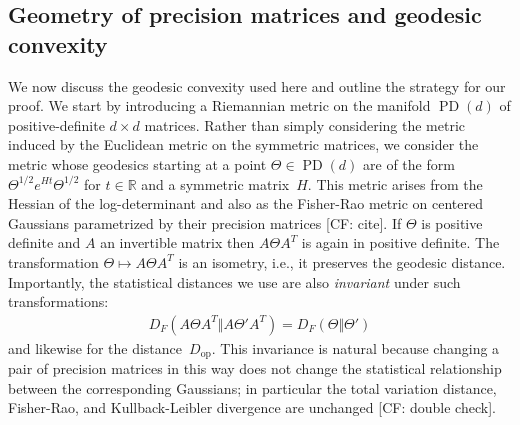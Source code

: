 \documentclass[aos]{imsart}
\theoremstyle{definition}
\numberwithin{equation}{section}
\DeclareMathOperator{\op}{op}
\DeclareMathOperator{\PD}{PD}
\DeclarePairedDelimiter{\norm}{\lVert}{\rVert}
\newcommand{\R}{{\mathbb{R}}}
\newcommand{\CF}[1]{{\color{purple}[CF: #1]}}
\begin{document}
\subsection{Geometry of precision matrices and geodesic convexity}\label{subsec:geom}
We now discuss the geodesic convexity used here and outline the strategy for our proof.
We start by introducing a Riemannian metric on the manifold $\PD(d)$ of positive-definite $d\times d$ matrices.
Rather than simply considering the metric induced by the Euclidean metric on the symmetric matrices, we consider the metric whose geodesics starting at a point $\Theta \in \PD(d)$ are of the form $\Theta^{1/2} e^{Ht} \Theta^{1/2}$ for $t \in \R$ and a symmetric matrix~$H$. %
This metric arises from the Hessian of the log-determinant \citep{bhatia2009positive} and also as the Fisher-Rao metric on centered Gaussians parametrized by their precision matrices \CF{cite}.
If $\Theta$ is positive definite and $A$ an invertible matrix then $A\Theta A^T$ is again in positive definite.
The transformation $\Theta \mapsto A\Theta A^T$ is an isometry, i.e., it preserves the geodesic distance.
Importantly, the statistical distances we use are also \emph{invariant} under such transformations:
\begin{align*}
  D_F(A \Theta A^T \Vert A \Theta' A^T) = D_F(\Theta \Vert \Theta')
\end{align*}
and likewise for the distance~$D_{\op}$.
This invariance is natural because changing a pair of precision matrices in this way does not change the statistical relationship between the corresponding Gaussians; in particular the total variation distance, Fisher-Rao, and Kullback-Leibler divergence are unchanged \CF{double check}.
\end{document}

